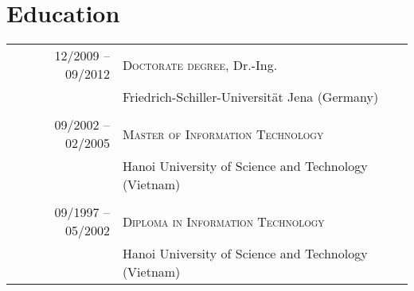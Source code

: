\documentclass[a4paper,8pt]{article} %
\begin{document}
\section{Education}

\begin{tabular}{r|l}	
12/2009 -- 09/2012 							& \textsc{Doctorate degree}, Dr.-Ing. \\
									& Friedrich-Schiller-Universität Jena (Germany) \\


\multicolumn{2}{c}{} \\	%

09/2002 -- 02/2005 							& \textsc{Master of Information Technology}\\
          							& Hanoi University of Science and Technology (Vietnam)\\ 
          					

\multicolumn{2}{c}{} \\	%

09/1997 -- 05/2002 							& \textsc{Diploma in Information Technology}\\
									& Hanoi University of Science and Technology (Vietnam)\\ 
         


\end{tabular}
\end{document}
